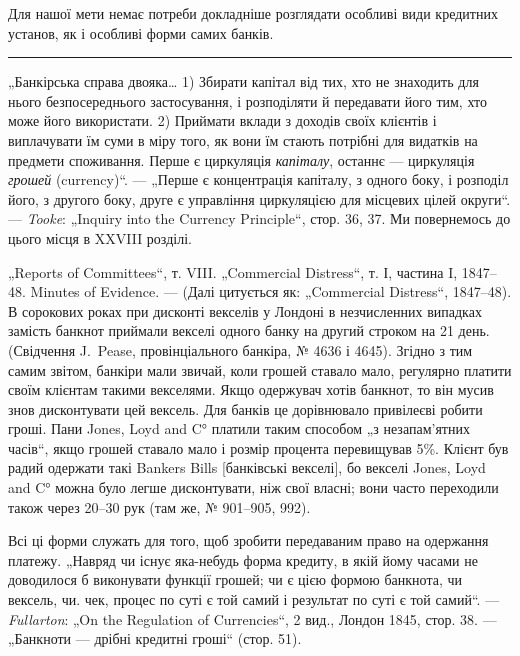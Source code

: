 Для нашої мети немає потреби докладніше розглядати особливі види кредитних установ, як і особливі
форми самих банків.

\pfbreak{}

„Банкірська справа двояка\dots{} 1) Збирати капітал від тих, хто не знаходить
для нього безпосереднього застосування, і розподіляти й передавати його
тим, хто може його використати. 2) Приймати вклади з доходів своїх клієнтів
і виплачувати їм суми в міру того, як вони їм стають потрібні для видатків
на предмети споживання. Перше є циркуляція \emph{капіталу}, останнє — циркуляція
\emph{грошей} (currency)“. — „Перше є концентрація капіталу, з одного боку, і розподіл його, з другого
боку, друге є управління циркуляцією для місцевих
цілей округи“. — \emph{Tooke}: „Inquiry into the Currency Principle“, стор. 36, 37. Ми
повернемось до цього місця в XXVIII розділі.

„Reports of Committees“, т. VIII. „Commercial Distress“, т. І, частина I, 1847--48.
Minutes of Evidence. — (Далі цитується як: „Commercial Distress“, 1847--48). В сорокових роках при
дисконті векселів у Лондоні в незчисленних випадках замість банкнот приймали векселі одного банку на
другий строком на 21 день.
(Свідчення J.~Pease, провінціального банкіра, № 4636 і 4645). Згідно з тим самим звітом, банкіри
мали звичай, коли грошей ставало мало, регулярно платити
своїм клієнтам такими векселями. Якщо одержувач хотів банкнот, то він мусив
знов дисконтувати цей вексель. Для банків це дорівнювало привілеєві робити
гроші. Пани Jones, Loyd and C° платили таким способом „з незапам’ятних часів“,
якщо грошей ставало мало і розмір процента перевищував 5\%. Клієнт був
радий одержати такі Bankers Bills [банківські векселі], бо векселі Jones, Loyd
and C° можна було легше дисконтувати, ніж свої власні; вони часто переходили також через 20--30 рук
(там же, № 901--905, 992).

Всі ці форми служать для того, щоб зробити передаваним право на одержання платежу. „Навряд чи існує
яка-небудь форма кредиту, в якій йому часами
не доводилося б виконувати функції грошей; чи є цією формою банкнота, чи
вексель, чи. чек, процес по суті є той самий і результат по суті є той самий“. — \emph{Fullarton}: „On the
Regulation of Currencies“, 2 вид., Лондон 1845, стор. 38. — „Банкноти — дрібні кредитні гроші“
(стор. 51).

